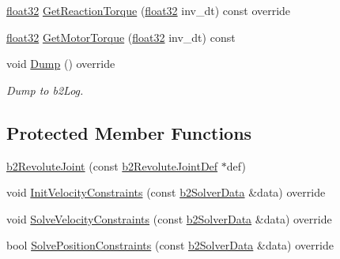\begin{DoxyCompactItemize}
\item 
\mbox{\hyperlink{b2_settings_8h_aacdc525d6f7bddb3ae95d5c311bd06a1}{float32}} \mbox{\hyperlink{classb2_revolute_joint_aab61a3f330aa93ae28f657e36bc3db51}{Get\+Reaction\+Torque}} (\mbox{\hyperlink{b2_settings_8h_aacdc525d6f7bddb3ae95d5c311bd06a1}{float32}} inv\+\_\+dt) const override
\item 
\mbox{\hyperlink{b2_settings_8h_aacdc525d6f7bddb3ae95d5c311bd06a1}{float32}} \mbox{\hyperlink{classb2_revolute_joint_a5abafb4d0c1df642f73a5d9faf615e26}{Get\+Motor\+Torque}} (\mbox{\hyperlink{b2_settings_8h_aacdc525d6f7bddb3ae95d5c311bd06a1}{float32}} inv\+\_\+dt) const
\item 
void \mbox{\hyperlink{classb2_revolute_joint_a408badabe21b169412a5c4a2f36bbbd8}{Dump}} () override
\begin{DoxyCompactList}\small\item\em Dump to b2\+Log. \end{DoxyCompactList}\end{DoxyCompactItemize}
\subsection*{Protected Member Functions}
\begin{DoxyCompactItemize}
\item 
\mbox{\hyperlink{classb2_revolute_joint_a2571c1438e909fb3518de6f88bb29e01}{b2\+Revolute\+Joint}} (const \mbox{\hyperlink{structb2_revolute_joint_def}{b2\+Revolute\+Joint\+Def}} $\ast$def)
\item 
void \mbox{\hyperlink{classb2_revolute_joint_a5ddddb865cc297c66721ae443bfb40a4}{Init\+Velocity\+Constraints}} (const \mbox{\hyperlink{structb2_solver_data}{b2\+Solver\+Data}} \&data) override
\item 
void \mbox{\hyperlink{classb2_revolute_joint_a8eee8e87c79588ff041f1382b7fcbcd4}{Solve\+Velocity\+Constraints}} (const \mbox{\hyperlink{structb2_solver_data}{b2\+Solver\+Data}} \&data) override
\item 
bool \mbox{\hyperlink{classb2_revolute_joint_a01cab9d9609926a6debcd457bb8068f2}{Solve\+Position\+Constraints}} (const \mbox{\hyperlink{structb2_solver_data}{b2\+Solver\+Data}} \&data) override
\end{DoxyCompactItemize}
